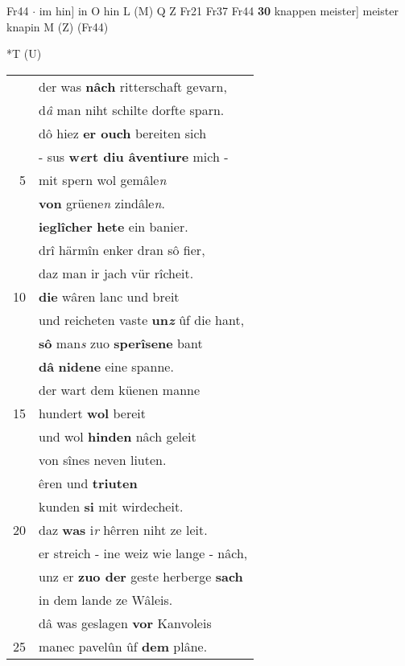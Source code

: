 \documentclass[8pt,a4paper,notitlepage]{article}
\begin{document}
\begin{table}[ht]
\begin{minipage}[t]{0.5\linewidth}
Fr44  $\cdot$ im hin] in O hin L (M) Q Z Fr21 Fr37 Fr44 \textbf{30} knappen meister] meister knapin M (Z) (Fr44) \newline
\end{minipage}
\hspace{0.5cm}
\begin{minipage}[t]{0.5\linewidth}
\small
\begin{center}*T (U)
\end{center}
\begin{tabular}{rl}
 & der was \textbf{nâch} ritterschaft gevarn,\\ 
 & d\textit{â} man niht schilte dorfte sparn.\\ 
 & dô hiez \textbf{er ouch} bereiten sich\\ 
 & - sus \textbf{w\textit{e}rt diu âventiure} mich -\\ 
5 & mit spern wol gemâle\textit{n}\\ 
 & \textbf{von} grüene\textit{n} zindâle\textit{n}.\\ 
 & \textbf{ieglîcher} \textbf{hete} ein banier.\\ 
 & drî härmîn enker dran sô fier,\\ 
 & daz man ir jach vür rîcheit.\\ 
10 & \textbf{die} wâren lanc und breit\\ 
 & und reicheten vaste \textbf{un\textit{z}} ûf die hant,\\ 
 & \textbf{sô} man\textit{s} zuo \textbf{sperîsene} bant\\ 
 & \textbf{dâ} \textbf{nidene} eine spanne.\\ 
 & der wart dem küenen manne\\ 
15 & hundert \textbf{wol} bereit\\ 
 & und wol \textbf{hinden} nâch geleit\\ 
 & von sînes neven liuten.\\ 
 & êren und \textbf{triuten}\\ 
 & kunden \textbf{si} mit wirdecheit.\\ 
20 & daz \textbf{was} i\textit{r} hêrren niht ze leit.\\ 
 & er streich - ine weiz wie lange - nâch,\\ 
 & unz er \textbf{zuo der} geste herberge \textbf{sach}\\ 
 & in dem lande ze Wâleis.\\ 
 & dâ was geslagen \textbf{vor} Kanvoleis\\ 
25 & manec pavelûn ûf \textbf{dem} plâne.\\ 

\end{tabular}
\end{minipage}
\end{table}
\end{document}
